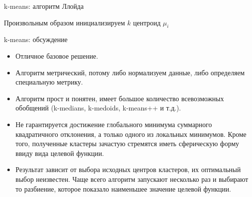 \documentclass{beamer}
\begin{document}
\begin{frame}{k-means: алгоритм Ллойда}
    \small
    
    \begin{algorithm}[H]
        
        Произвольным образом инициализируем $k$ центроид $\mu_i$\\
        \caption{k-means}
    \end{algorithm}
\end{frame}


\begin{frame}{k-means: обсуждение}
    \small
    
    \begin{itemize}
        \item Отличное базовое решение.
        \item Алгоритм метрический, потому либо нормализуем данные, либо определяем специальную метрику.
        \item Алгоритм прост и понятен, имеет большое количество всевозможных обобщений (k-medians, k-medoids, k-means++ и т.д.).
        \item Не гарантируется достижение глобального минимума суммарного квадратичного отклонения, а только одного из локальных минимумов. Кроме того, полученные кластеры зачастую стремятся иметь сферическую форму ввиду вида целевой функции.
        \item Результат зависит от выбора исходных центров кластеров, их оптимальный выбор неизвестен. Чаще всего алгоритм запускают несколько раз и выбирают то разбиение, которое показало наименьшее значение целевой функции.
    \end{itemize}
\end{frame}
\end{document}
